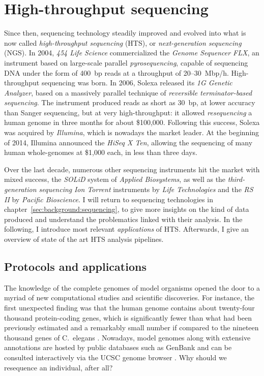 
\section{High-throughput sequencing}

Since then, sequencing technology steadily improved and evolved into what is now called \emph{high-throughput sequencing} (HTS), or \emph{next-generation sequencing} (NGS).
In 2004, \emph{454 Life Science} commercialized the \emph{Genome Sequencer FLX}, an instrument based on large-scale parallel \emph{pyrosequencing}, capable of sequencing DNA under the form of 400~bp reads at a throughput of 20--30~Mbp/h.
High-throughput sequencing was born.
In 2006, Solexa released its \emph{1G Genetic Analyzer}, based on a massively parallel technique of \emph{reversible terminator-based sequencing}.
The instrument produced reads as short as 30~bp, at lower accuracy than Sanger sequencing, but at very high-throughput: it allowed \emph{resequencing} a human genome in three months for about \$100,000.
Following this success, Solexa was acquired by \emph{Illumina}, which is nowadays the market leader.
At the beginning of 2014, Illumina announced the \emph{HiSeq X Ten}, allowing the sequencing of many human whole-genomes at \$1,000 each, in less than three days.

Over the last decade, numerous other sequencing instruments hit the market with mixed success, \eg the \emph{SOLiD} system of \emph{Applied Biosystems}, as well as the \emph{third-generation sequencing} \emph{Ion Torrent} instruments by \emph{Life Technologies} and the \emph{RS II} by \emph{Pacific Bioscience}.
I will return to sequencing technologies in chapter~\ref{sec:background:sequencing}, to give more insights on the kind of data produced and understand the problematics linked with their analysis.
In the following, I introduce most relevant \emph{applications} of HTS.
Afterwards, I give an overview of state of the art HTS analysis pipelines.

\subsection{Protocols and applications}

The knowledge of the complete genomes of model organisms opened the door to a myriad of new computational studies and scientific discoveries.
For instance, the first unexpected finding was that the human genome contains about twenty-four thousand protein-coding genes, which is significantly fewer than what had been previously estimated and a remarkably small number if compared to the nineteen thousand genes of C.~elegans \citep{Hodgkin2001}.
Nowadays, model genomes along with extensive annotations are hosted by public databases such as GenBank \citep{genbank} and can be consulted interactively \eg via the UCSC genome browser \citep{ucscgb}.
Why should we resequence an individual, after all?

